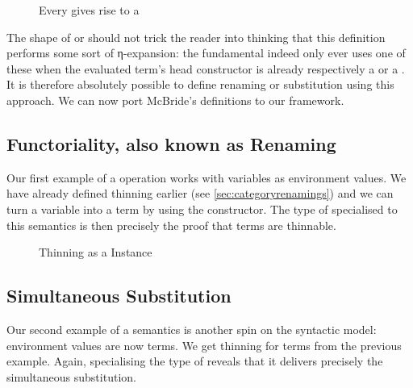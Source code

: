 \begin{figure}[h]
\caption{Every  gives rise to a \label{fig:syntactic}}
\end{figure}

The shape of  or  should not trick the reader
into thinking that this definition performs some sort of η-expansion:
the fundamental  indeed only ever uses one of these when the
evaluated term's head constructor is already respectively a 
or a . It is therefore absolutely possible to define renaming
or substitution using this approach. We can now port McBride's definitions
to our framework.


\subsection{Functoriality, also known as Renaming}

Our first example of a  operation works with variables as
environment values. We have already defined thinning earlier (see
\cref{sec:categoryrenamings}) and we can turn a variable into a term by using
the  constructor. The type of  specialised to this
semantics is then precisely the proof that terms are thinnable.

\begin{figure}[h]
\begin{minipage}{0.5\textwidth}
\end{minipage}\begin{minipage}{0.5\textwidth}
\end{minipage}
\caption{Thinning as a  Instance\label{fig:synren}}
\end{figure}

\subsection{Simultaneous Substitution}

Our second example of a semantics is another spin on the syntactic model:
environment values are now terms. We get thinning for terms from the
previous example. Again, specialising the type of 
reveals that it delivers precisely the simultaneous substitution.

